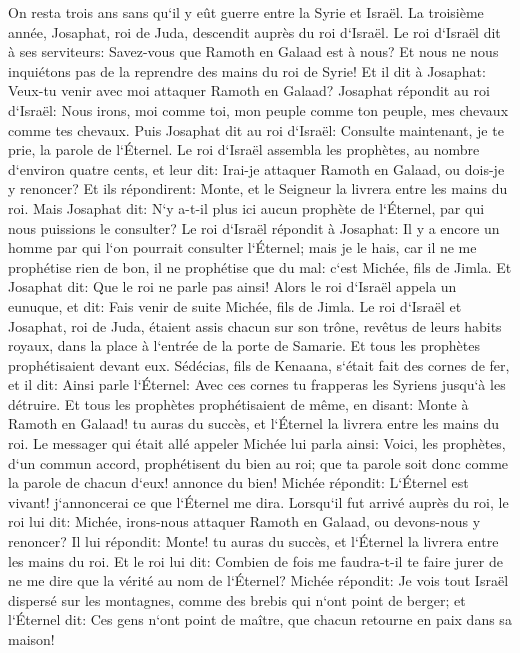\verse On resta trois ans sans qu`il y eût guerre entre la Syrie et Israël. 
\verse La troisième année, Josaphat, roi de Juda, descendit auprès du roi d`Israël. 
\verse Le roi d`Israël dit à ses serviteurs: Savez-vous que Ramoth en Galaad est à nous? Et nous ne nous inquiétons pas de la reprendre des mains du roi de Syrie! 
\verse Et il dit à Josaphat: Veux-tu venir avec moi attaquer Ramoth en Galaad? Josaphat répondit au roi d`Israël: Nous irons, moi comme toi, mon peuple comme ton peuple, mes chevaux comme tes chevaux. 
\verse Puis Josaphat dit au roi d`Israël: Consulte maintenant, je te prie, la parole de l`Éternel. 
\verse Le roi d`Israël assembla les prophètes, au nombre d`environ quatre cents, et leur dit: Irai-je attaquer Ramoth en Galaad, ou dois-je y renoncer? Et ils répondirent: Monte, et le Seigneur la livrera entre les mains du roi. 
\verse Mais Josaphat dit: N`y a-t-il plus ici aucun prophète de l`Éternel, par qui nous puissions le consulter? 
\verse Le roi d`Israël répondit à Josaphat: Il y a encore un homme par qui l`on pourrait consulter l`Éternel; mais je le hais, car il ne me prophétise rien de bon, il ne prophétise que du mal: c`est Michée, fils de Jimla. Et Josaphat dit: Que le roi ne parle pas ainsi! 
\verse Alors le roi d`Israël appela un eunuque, et dit: Fais venir de suite Michée, fils de Jimla. 
\verse Le roi d`Israël et Josaphat, roi de Juda, étaient assis chacun sur son trône, revêtus de leurs habits royaux, dans la place à l`entrée de la porte de Samarie. Et tous les prophètes prophétisaient devant eux. 
\verse Sédécias, fils de Kenaana, s`était fait des cornes de fer, et il dit: Ainsi parle l`Éternel: Avec ces cornes tu frapperas les Syriens jusqu`à les détruire. 
\verse Et tous les prophètes prophétisaient de même, en disant: Monte à Ramoth en Galaad! tu auras du succès, et l`Éternel la livrera entre les mains du roi. 
\verse Le messager qui était allé appeler Michée lui parla ainsi: Voici, les prophètes, d`un commun accord, prophétisent du bien au roi; que ta parole soit donc comme la parole de chacun d`eux! annonce du bien! 
\verse Michée répondit: L`Éternel est vivant! j`annoncerai ce que l`Éternel me dira. 
\verse Lorsqu`il fut arrivé auprès du roi, le roi lui dit: Michée, irons-nous attaquer Ramoth en Galaad, ou devons-nous y renoncer? Il lui répondit: Monte! tu auras du succès, et l`Éternel la livrera entre les mains du roi. 
\verse Et le roi lui dit: Combien de fois me faudra-t-il te faire jurer de ne me dire que la vérité au nom de l`Éternel? 
\verse Michée répondit: Je vois tout Israël dispersé sur les montagnes, comme des brebis qui n`ont point de berger; et l`Éternel dit: Ces gens n`ont point de maître, que chacun retourne en paix dans sa maison! 
